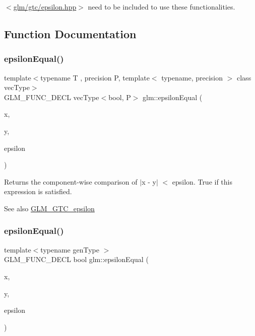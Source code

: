 $<$\hyperlink{epsilon_8hpp}{glm/gtc/epsilon.\+hpp}$>$ need to be included to use these functionalities. 

\subsection{Function Documentation}
\mbox{\label{group__gtc__epsilon_gaca9443f217dc36587624247245522331}} 
\subsubsection{\texorpdfstring{epsilon\+Equal()}{epsilonEqual()}\hspace{0.1cm}{\footnotesize\ttfamily [1/2]}}
{\footnotesize\ttfamily template$<$typename T , precision P, template$<$ typename, precision $>$ class vec\+Type$>$ \\
G\+L\+M\+\_\+\+F\+U\+N\+C\+\_\+\+D\+E\+CL vec\+Type$<$bool, P$>$ glm\+::epsilon\+Equal (\begin{DoxyParamCaption}\item[{vec\+Type$<$ T, P $>$ const \&}]{x,  }\item[{vec\+Type$<$ T, P $>$ const \&}]{y,  }\item[{T const \&}]{epsilon }\end{DoxyParamCaption})}

Returns the component-\/wise comparison of $\vert$x -\/ y$\vert$ $<$ epsilon. True if this expression is satisfied.

\begin{DoxySeeAlso}{See also}
\hyperlink{group__gtc__epsilon}{G\+L\+M\+\_\+\+G\+T\+C\+\_\+epsilon} 
\end{DoxySeeAlso}
\mbox{\label{group__gtc__epsilon_gaa7f227999ca09e7ca994e8b35aba47bb}} 
\subsubsection{\texorpdfstring{epsilon\+Equal()}{epsilonEqual()}\hspace{0.1cm}{\footnotesize\ttfamily [2/2]}}
{\footnotesize\ttfamily template$<$typename gen\+Type $>$ \\
G\+L\+M\+\_\+\+F\+U\+N\+C\+\_\+\+D\+E\+CL bool glm\+::epsilon\+Equal (\begin{DoxyParamCaption}\item[{gen\+Type const \&}]{x,  }\item[{gen\+Type const \&}]{y,  }\item[{gen\+Type const \&}]{epsilon }\end{DoxyParamCaption})}

